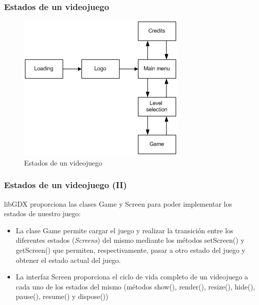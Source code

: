 \documentclass[xcolor={dvipsnames}]{beamer}
\begin{document}
\begin{frame}\frametitle{Estados de un videojuego}
    \begin{block}{}
    \begin{figure}
    \includegraphics[scale=0.5]{images/game_screens} 
    \caption{Estados de un videojuego}
    \end{figure}
    \end{block}
\end{frame}

\begin{frame}\frametitle{Estados de un videojuego (II)}
    \begin{block}{}
    \textcolor{resalta}{libGDX} proporciona las clases \textcolor{resalta}{Game} y \textcolor{resalta}{Screen} para poder implementar los
    estados de nuestro juego:
    \begin{itemize}
        \item La clase \textcolor{resalta}{Game} permite cargar el juego y realizar la transición entre los diferentes estados (\emph{Screens}) del mismo
        mediante los métodos \textcolor{resalta}{setScreen()} y \textcolor{resalta}{getScreen()} que permiten, respectivamente, pasar a otro
        estado del juego y obtener el estado actual del juego.
        \item La interfaz \textcolor{resalta}{Screen} proporciona el ciclo de vida completo de un videojuego a cada uno de los estados del
        mismo (métodos \textcolor{resalta}{show()}, \textcolor{resalta}{render()}, \textcolor{resalta}{resize()},
        \textcolor{resalta}{hide()}, \textcolor{resalta}{pause()}, \textcolor{resalta}{resume()} y \textcolor{resalta}{dispose()})
    \end{itemize}
    \end{block}
\end{frame}
\end{document}
